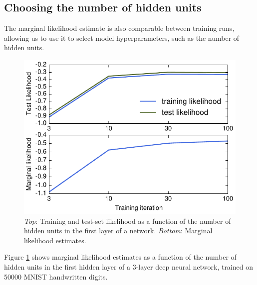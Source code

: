 \documentclass[]{article}
\begin{document}
\subsection{Choosing the number of hidden units}


The marginal likelihood estimate is also comparable between training runs, allowing us to use it to select model hyperparameters, such as the number of hidden units.

\begin{figure}[h!]
\begin{center}
\includegraphics[width=\columnwidth]{../experiments/2015_03_03_vary_width/6_hidden_units/vary_widths.pdf}
\vskip -0.1in
\caption{\emph{Top}: Training and test-set likelihood as a function of the number of hidden units in the first layer of a network.
\emph{Bottom}: Marginal likelihood estimates.}
\label{fig:num hiddens}
\end{center}
\end{figure}

Figure \ref{fig:num hiddens} shows marginal likelihood estimates as a function of the number of hidden units in the first hidden layer of a 3-layer deep neural network, trained on 50000 MNIST handwritten digits.
\end{document}
